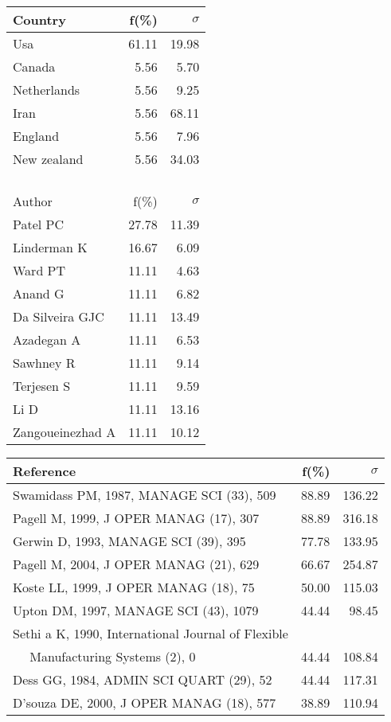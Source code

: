 \documentclass[a4paper,11pt]{report}
\begin{document}
\begin{landscape}
\begin{table}[!ht]
{\begin{tabular}{|l r r|}
\hline
\hline
Country & f(\%) & $\sigma$\\
\hline
Usa & 61.11 & 19.98\\
Canada & 5.56 & 5.70\\
Netherlands & 5.56 & 9.25\\
Iran & 5.56 & 68.11\\
England & 5.56 & 7.96\\
New zealand & 5.56 & 34.03\\
 &  & \\
 &  & \\
 &  & \\
 &  & \\
\hline
\hline
Author & f(\%) & $\sigma$\\
\hline
Patel PC & 27.78 & 11.39\\
Linderman K & 16.67 & 6.09\\
Ward PT & 11.11 & 4.63\\
Anand G & 11.11 & 6.82\\
Da Silveira GJC & 11.11 & 13.49\\
Azadegan A & 11.11 & 6.53\\
Sawhney R & 11.11 & 9.14\\
Terjesen S & 11.11 & 9.59\\
Li D & 11.11 & 13.16\\
Zangoueinezhad A & 11.11 & 10.12\\
\hline
\end{tabular}
}
{\scriptsize\begin{tabular}{|l r r|}
\hline
Reference & f(\%) & $\sigma$\\
\hline
Swamidass PM, 1987, MANAGE SCI (33), 509 & 88.89 & 136.22\\
Pagell M, 1999, J OPER MANAG (17), 307 & 88.89 & 316.18\\
Gerwin D, 1993, MANAGE SCI (39), 395 & 77.78 & 133.95\\
Pagell M, 2004, J OPER MANAG (21), 629 & 66.67 & 254.87\\
Koste LL, 1999, J OPER MANAG (18), 75 & 50.00 & 115.03\\
Upton DM, 1997, MANAGE SCI (43), 1079 & 44.44 & 98.45\\
Sethi a K, 1990, International Journal of Flexible &  & \\
$\quad$ Manufacturing Systems (2), 0 & 44.44 & 108.84\\
Dess GG, 1984, ADMIN SCI QUART (29), 52 & 44.44 & 117.31\\
D'souza DE, 2000, J OPER MANAG (18), 577 & 38.89 & 110.94\\

\end{tabular}}
\end{table}
\end{landscape}
\end{document}
